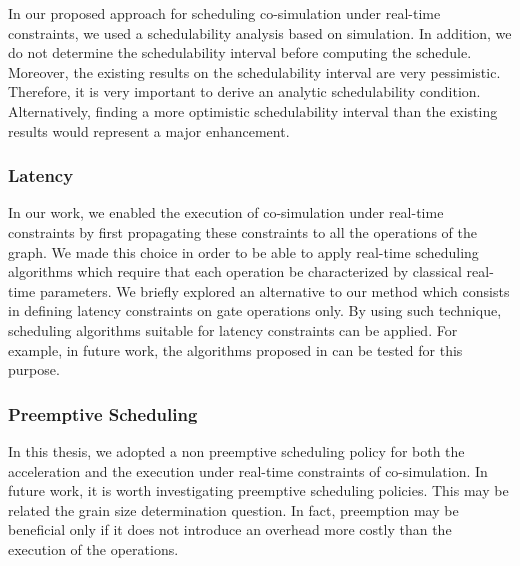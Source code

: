 In our proposed approach for scheduling co-simulation under real-time constraints, we used a schedulability analysis based on simulation. In addition, we do not determine the schedulability interval before computing the schedule. Moreover, the existing results on the schedulability interval are very pessimistic. Therefore, it is very important to derive an analytic schedulability condition. Alternatively, finding a more optimistic schedulability interval than the existing results would represent a major enhancement.

\subsubsection{Latency}

In our work, we enabled the execution of co-simulation under real-time constraints by first propagating these constraints to all the operations of the graph. We made this choice in order to be able to apply real-time scheduling algorithms which require that each operation be characterized by classical real-time parameters. We briefly explored an alternative to our method which consists in defining latency constraints on gate operations only. By using such technique, scheduling algorithms suitable for latency constraints can be applied. For example, in future work, the algorithms proposed in \cite{kermia:2009} can be tested for this purpose.  

\subsubsection{Preemptive Scheduling} 
In this thesis, we adopted a non preemptive scheduling policy for both the acceleration and the execution under real-time constraints of co-simulation. In future work, it is worth investigating preemptive scheduling policies. This may be related the grain size determination question. In fact, preemption may be beneficial only if it does not introduce an overhead more costly than the execution of the operations.

